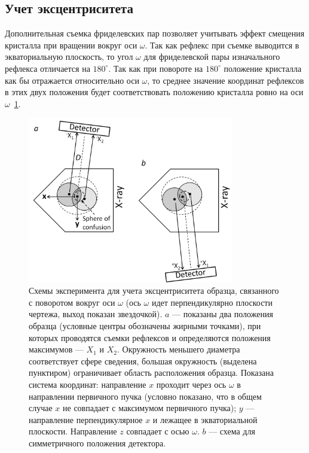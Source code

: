 \documentclass[a4paper,14pt]{extarticle}
\newcommand{\degree}{^\circ}
\newcounter{x}
\begin{document}
\subsection{Учет эксцентриситета}
Дополнительная съемка фриделевских пар позволяет учитывать эффект смещения кристалла при вращении вокруг оси $\omega$.
Так как рефлекс при съемке выводится в экваториальную плоскость, то угол $\omega$ для фриделевской пары изначального рефлекса отличается на $180\degree$.
Так как при повороте на $180\degree$ положение кристалла как бы отражается относительно оси $\omega$, то среднее значение координат рефлексов в этих двух положения будет соответствовать положению кристалла ровно на оси $\omega$~\ref{fig:eccentr}.

\begin{figure}[ht!]
    \centering
    \includegraphics[width=0.8\textwidth]{eccentr.png}
    \caption{Схемы эксперимента для учета эксцентриситета образца, связанного с поворотом вокруг оси $\omega$ (ось $\omega$ идет перпендикулярно плоскости чертежа, выход показан звездочкой). $a$ --- показаны два положения образца (условные центры обозначены жирными точками), при которых проводятся съемки рефлексов и определяются положения максимумов –-- $X_1$ и $X_2$. Окружность меньшего диаметра соответствует сфере сведения, большая окружность (выделена пунктиром) ограничивает область расположения образца. Показана система координат: направление $x$ проходит через ось $\omega$ в направлении первичного пучка (условно показано, что в общем случае $x$ не совпадает с максимумом первичного пучка); $y$ --– направление перпендикулярное $x$ и лежащее в экваториальной плоскости. Направление $z$ совпадает с осью $\omega$. $b$ –-- схема для симметричного положения детектора.}
    \label{fig:eccentr}
\end{figure}
\end{document}
